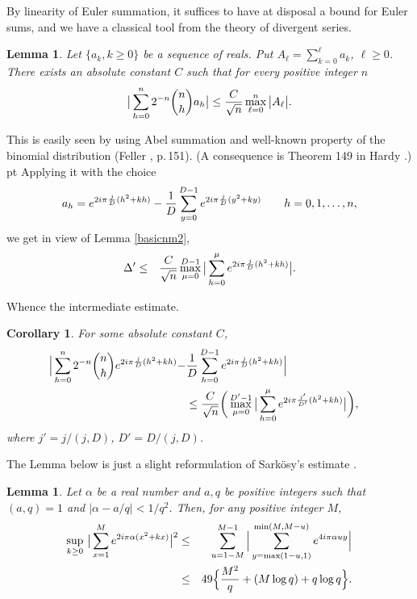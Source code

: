 \documentclass[11pt,draft,reqno]{amsart}
\newtheorem{lemma}[theorem]{Lemma}
\newtheorem{corollary}[theorem]{Corollary}
\theoremstyle{definition}
\theoremstyle{remarks}
\numberwithin{equation}{section}
\def \a{{\alpha}}
\def \D{{\Delta}}
\def \m{{\mu}}
\def \qq{{\qquad}}
\begin{document}
 By  linearity of Euler summation, it suffices to have at disposal a bound for Euler sums, and we have a  classical tool from the theory of divergent series.  
\begin{lemma}  \label{Eulerbound}Let
$\{a_k, k\ge 0\}$ be a  sequence of reals. Put $A_\ell= \sum_{k=0}^\ell a_k$,  $\ell\ge 0$.
 There exists an   absolute constant $C$ such that for every positive integer $n$
\begin{equation} \label{4.6}\big| \sum_{h=0}^n   2^{-n}{{n}\choose{h}} a_h\big|\le {C\over \sqrt n}\max_{\ell=0}^n\big|A_\ell\big|
.\end{equation}
   \end{lemma}
  This is easily seen by using Abel summation and well-known property of the binomial distribution (Feller \cite{F}, p.\,151). (A  consequence is   Theorem 149 in Hardy \cite{H}.)
 pt
Applying   it  with the choice $$a_h=  e^{2i\pi{j\over D} (h^2+kh)}-
{1\over D}\sum_{y= 0}^{D-1}e^{2i\pi{j\over D}  (y^2+ky)}  \qq h=0,1,\ldots,n,$$
  we get in view of   Lemma \ref{basicnm2},
 \begin{eqnarray}
\D'&\le & { C\over \sqrt n}\max_{\m=0}^{D-1}  \big|\sum_{h= 0}^{\m}e^{2i\pi{j\over D} 
(h^2+kh)}\big|  . 
\end{eqnarray}
 
 Whence the   intermediate estimate.
 \begin{corollary} For some absolute constant $C$, 
 \begin{align}  \label{4.81}   \Big|\sum_{h=0}^n   2^{-n}{{n}\choose{h}} e^{2i\pi{j\over D} (h^2+kh)}-& {1\over D}\sum_{h=
0}^{D-1}e^{2i\pi{j\over D}  (h^2+kh)} \Big|
\cr &\le  {C\over \sqrt n}\bigg(\max_{\m=0}^{D'-1} \big|\sum_{h=0}^{\m} e^{2i\pi{j'\over D'} 
(h^2+kh)} 
\big| \bigg), 
\end{align} where  
$j'=  j/(j,D)
$,
$D'=D/(j,D)$.
 \end{corollary}
 The Lemma below  is just a slight reformulation of Sark\"osy's estimate \cite{Sa}. 
\begin{lemma}  Let  $\a$ be a real number and    $a,q$ be positive integers such that $(a,q)=1$ and
$|\a-a/q|<1/q^2$. Then, for any positive integer  $M$, 
\begin{eqnarray}\label{sarko}
\sup_{k\ge 0}\,\big|\sum_{x=1}^M e^{2i\pi
\a (x^2 +kx)}\big|^2&\le &\sum_{u=1-M}^{M-1}\Big|\sum_{y=\max(1-u,1) }^{\min(M,M-u)}e^{4i\pi \a uy}\Big|
\cr &\le &49
\Big\{{M^2\over  q}+(M\log q) + q\log q \Big\}.
\end{eqnarray} 
\end{lemma}
\end{document}
